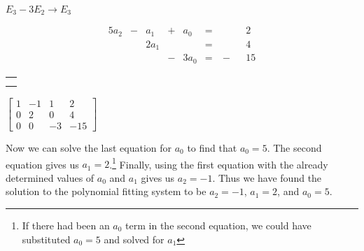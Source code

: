 \hspace{-0.2in}
\begin{minipage}{0.7in}
\vspace{0.6in}
{\tiny $E_3-3E_2\to E_3$}
\end{minipage}
\hspace{-0.1in}
\begin{minipage}{1.8in}
\vspace{-0.1in}
\begin{alignat*}{5}
{}a_2	&{}-{} 	&{}a_1 		&{}+{}	&{}a_0 	&{}= & \ {}&&{}2   \\
{}	 		&{}		&2a_1 		&{}		&{}	 	&{}= & \ {}&&{}4    \\
{} 		&{} 		&{} 			&{}-{}	&3a_0 	&{}= & \ {-}&&{15}
\end{alignat*} 
\end{minipage}
\begin{minipage}{2.35in}
\begin{center}
\renewcommand{\arraystretch}{1.2}
\begin{tabular}{r} \\ \\ \vspace{0.0in}{\tiny $R_3-3R_2\to R_3$} \\ \end{tabular} \hspace{-0.1in}$\left[ \begin{array}{rrr|r} 1 	 &-1 	&1 &2 	\\ 0	&2		&0 &4	\\ 0	&0		&-3 &-15 \end{array} \right]$
\end{center}
\end{minipage}


Now we can solve the last equation for $a_0$ to find that $a_0=5$. The second equation gives us $a_1 = 2$.\footnote{If there had been an $a_0$ term in the second equation, we could have substituted $a_0=5$ and solved for $a_1$} Finally, using the first equation with the already determined values of $a_0$ and $a_1$ gives us $a_2=-1$. Thus we have found the solution to the polynomial fitting system to be $a_2=-1$, $a_1=2$, and $a_0=5$. 



